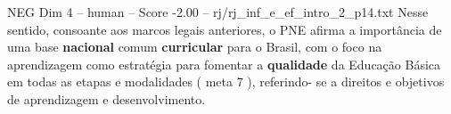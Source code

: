 \begin{textsample}{NEG Dim 4 – human – Score -2.00 – rj/rj\_inf\_e\_ef\_intro\_2\_p14.txt}  \label{ex:f4_neg_003}
Nesse sentido, consoante aos marcos legais anteriores, o PNE afirma a importância de uma base \textbf{nacional} comum \textbf{curricular} para o Brasil, com o foco na aprendizagem como estratégia para fomentar a \textbf{qualidade} da Educação Básica em todas as etapas e modalidades ( meta 7 ), referindo- se a direitos e objetivos de aprendizagem e desenvolvimento.

\end{textsample}
